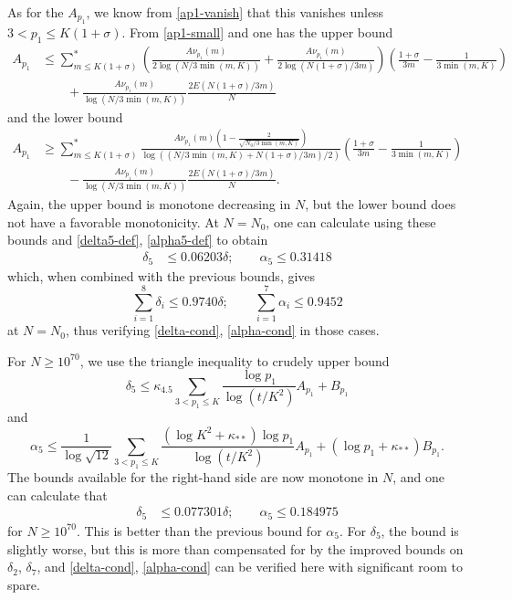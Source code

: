 \documentclass[10pt,a4paper,reqno]{amsart}
\numberwithin{equation}{section}
\theoremstyle{plain}
\theoremstyle{definition}
\begin{document}
As for the $A_{p_1}$, we know from \eqref{ap1-vanish} that this vanishes unless $3 < p_1 \leq K(1+\sigma)$.  From \eqref{ap1-small} and  one has the upper bound
\begin{align*}
A_{p_1} &\leq \sum_{m \leq K(1+\sigma)}^* \left(\frac{A \nu_{p_1}(m)}{2\log(N/3\min(m,K))} + \frac{A \nu_{p_1}(m)}{2\log(N(1+\sigma)/3m)} \right) \left( \frac{1+\sigma}{3m} - \frac{1}{3\min(m,K)}\right) \\
& \quad \quad + \frac{A \nu_{p_1}(m)}{\log(N/3\min(m,K))} \frac{2E(N(1+\sigma)/3m)}{N}  
\end{align*}
and the lower bound
\begin{align*}
A_{p_1} &\geq \sum_{m \leq K(1+\sigma)}^* \frac{A \nu_{p_1}(m)\left(1-\frac{2}{\sqrt{N_0/3\min(m,K)}}\right) }{\log((N/3\min(m,K) + N(1+\sigma)/3m)/2)} \left(\frac{1+\sigma}{3m} - \frac{1}{3\min(m,K)}\right) \\
& \quad \quad - \frac{A \nu_{p_1}(m)}{\log(N/3\min(m,K))}  \frac{2E(N(1+\sigma)/3m)}{N}.
\end{align*}
Again, the upper bound is monotone decreasing in $N$, but the lower bound does not have a favorable monotonicity. At $N=N_0$, one can calculate using these bounds and \eqref{delta5-def}, \eqref{alpha5-def} to obtain
\begin{align*}
\delta_5 &\leq 0.06203 \delta; \qquad \alpha_5 \leq 0.31418
\end{align*}
which, when combined with the previous bounds, gives
$$ \sum_{i=1}^8 \delta_i  \leq 0.9740 \delta; \qquad \sum_{i=1}^7 \alpha_i \leq 0.9452$$
at $N=N_0$, thus verifying \eqref{delta-cond}, \eqref{alpha-cond} in those cases.

For $N \geq 10^{70}$, we use the triangle inequality to crudely upper bound
$$ \delta_5 \leq \kappa_{4.5} \sum_{3 < p_1 \leq K} \frac{\log p_1}{\log(t/K^2)} A_{p_1} + B_{p_1}$$
and
$$ \alpha_5 \leq \frac{1}{\log \sqrt{12}} \sum_{3 < p_1 \leq K}  \frac{(\log K^2+\kappa_{**})\log p_1}{\log(t/K^2)} A_{p_1} + (\log p_1 + \kappa_{**}) B_{p_1}.$$
The bounds available for the right-hand side are now monotone in $N$, and one can calculate that
\begin{align*}
  \delta_5 &\leq 0.077301 \delta; \qquad \alpha_5 \leq 0.184975
  \end{align*}
for $N \geq 10^{70}$. This is better than the previous bound for $\alpha_5$.  For $\delta_5$, the bound is slightly worse, but this is more than compensated for by the improved bounds on $\delta_2$, $\delta_7$, and \eqref{delta-cond}, \eqref{alpha-cond} can be verified here with significant room to spare.
\end{document}
